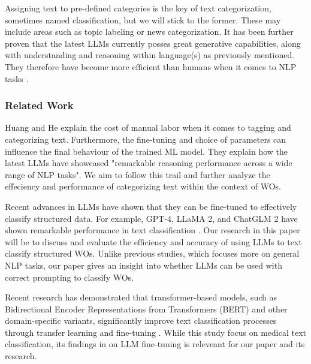 \documentclass{article}
\begin{document}
Assigning text to pre-defined categories is the key of text categorization,
sometimes named classification, but we will stick to the former.
These may include areas such as topic labeling or news categorization.
It has been further proven that the latest LLMs currently posses great generative capabilities,
along with understanding and reasoning within language(s) as previously mentioned.
They therefore have become more efficient than humans when it comes to NLP tasks \cite{zhang2024}.

\subsubsection{Related Work}

Huang and He \cite{huang2024} explain the cost of manual labor when it comes to tagging and categorizing text.
Furthermore, the fine-tuning and choice of parameters can influence the final behaviour of the trained ML model.
They explain how the latest LLMs have showcased "remarkable reasoning performance across a wide range of
NLP tasks".
We aim to follow this trail and further analyze the effeciency and performance of categorizing text within the
context of WOs.

Recent advances in LLMs have shown that they can be fine-tuned to effectively classify structured data.
For example, GPT-4, LLaMA 2, and ChatGLM 2 have shown remarkable performance in text classification \cite{zhang2024}.
Our research in this paper will be to discuss and evaluate the efficiency and accuracy of using LLMs
to text classify structured WOs.
Unlike previous studies, which focuses more on general NLP tasks,
our paper gives an insight into whether LLMs can be used with correct prompting to classify WOs.

Recent research has demonstrated that transformer-based models, such as
Bidirectional Encoder Representations from Transformers (BERT) and other domain-specific variants,
significantly improve text classification processes through transfer learning and fine-tuning \cite{Nazyrova2024}.
While this study focus on medical text classification, its findings in on LLM fine-tuning is releveant for our
paper and its research.





\end{document}
